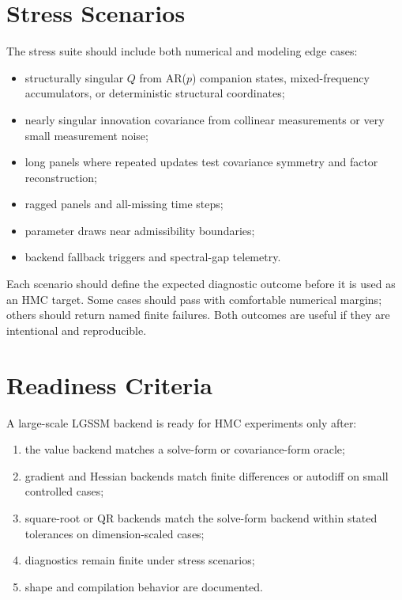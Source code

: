\section{Stress Scenarios}
\label{sec:bf-lgssm-stress-scenarios}

The stress suite should include both numerical and modeling edge cases:
\begin{itemize}
  \item structurally singular $Q$ from AR($p$) companion states,
    mixed-frequency accumulators, or deterministic structural coordinates;
  \item nearly singular innovation covariance from collinear measurements or
    very small measurement noise;
  \item long panels where repeated updates test covariance symmetry and factor
    reconstruction;
  \item ragged panels and all-missing time steps;
  \item parameter draws near admissibility boundaries;
  \item backend fallback triggers and spectral-gap telemetry.
\end{itemize}
Each scenario should define the expected diagnostic outcome before it is used
as an HMC target.  Some cases should pass with comfortable numerical margins;
others should return named finite failures.  Both outcomes are useful if they
are intentional and reproducible.

\section{Readiness Criteria}
\label{sec:bf-lgssm-readiness}

A large-scale LGSSM backend is ready for HMC experiments only after:
\begin{enumerate}[label=(\roman*)]
  \item the value backend matches a solve-form or covariance-form oracle;
  \item gradient and Hessian backends match finite differences or autodiff on
    small controlled cases;
  \item square-root or QR backends match the solve-form backend within stated
    tolerances on dimension-scaled cases;
  \item diagnostics remain finite under stress scenarios;
  \item shape and compilation behavior are documented.
\end{enumerate}

